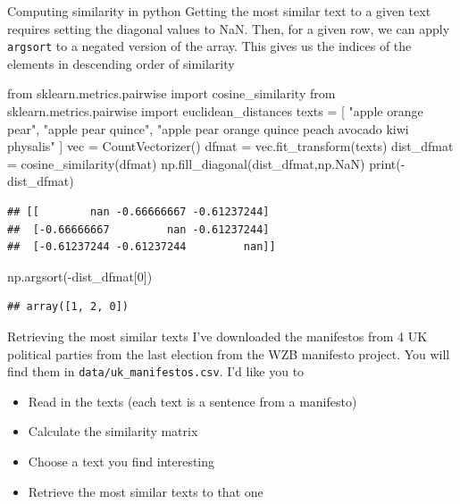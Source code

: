 \documentclass[
  10pt,
  ignorenonframetext,
  aspectratio=169]{beamer}
\newenvironment{Shaded}{\begin{snugshade}}{\end{snugshade}}
\newcommand{\BuiltInTok}[1]{\textcolor[rgb]{0.80,0.80,0.80}{#1}}
\newcommand{\DecValTok}[1]{\textcolor[rgb]{0.86,0.86,0.80}{#1}}
\newcommand{\ImportTok}[1]{\textcolor[rgb]{0.80,0.80,0.80}{#1}}
\newcommand{\NormalTok}[1]{\textcolor[rgb]{0.80,0.80,0.80}{#1}}
\newcommand{\OperatorTok}[1]{\textcolor[rgb]{0.94,0.94,0.82}{#1}}
\newcommand{\StringTok}[1]{\textcolor[rgb]{0.80,0.58,0.58}{#1}}
\providecommand{\tightlist}{%
  \setlength{\itemsep}{0pt}\setlength{\parskip}{0pt}}
\begin{document}
\begin{frame}[fragile]{Computing similarity in python}
\protect\hypertarget{computing-similarity-in-python-1}{}
Getting the most similar text to a given text requires setting the
diagonal values to NaN. Then, for a given row, we can apply
\texttt{argsort} to a negated version of the array. This gives us the
indices of the elements in descending order of similarity

\scriptsize

\begin{Shaded}
\begin{Highlighting}[]
\ImportTok{from}\NormalTok{ sklearn.metrics.pairwise }\ImportTok{import}\NormalTok{ cosine\_similarity}
\ImportTok{from}\NormalTok{ sklearn.metrics.pairwise }\ImportTok{import}\NormalTok{ euclidean\_distances}
\NormalTok{texts }\OperatorTok{=}\NormalTok{ [}
  \StringTok{"apple orange pear"}\NormalTok{, }\StringTok{"apple pear quince"}\NormalTok{,}
  \StringTok{"apple pear orange quince peach avocado kiwi physalis"}
\NormalTok{]}
\NormalTok{vec }\OperatorTok{=}\NormalTok{ CountVectorizer()}
\NormalTok{dfmat }\OperatorTok{=}\NormalTok{ vec.fit\_transform(texts)}
\NormalTok{dist\_dfmat }\OperatorTok{=}\NormalTok{ cosine\_similarity(dfmat)}
\NormalTok{np.fill\_diagonal(dist\_dfmat,np.NaN)}
\BuiltInTok{print}\NormalTok{(}\OperatorTok{{-}}\NormalTok{dist\_dfmat)}
\end{Highlighting}
\end{Shaded}

\begin{verbatim}
## [[        nan -0.66666667 -0.61237244]
##  [-0.66666667         nan -0.61237244]
##  [-0.61237244 -0.61237244         nan]]
\end{verbatim}

\begin{Shaded}
\begin{Highlighting}[]
\NormalTok{np.argsort(}\OperatorTok{{-}}\NormalTok{dist\_dfmat[}\DecValTok{0}\NormalTok{])}
\end{Highlighting}
\end{Shaded}

\begin{verbatim}
## array([1, 2, 0])
\end{verbatim}
\end{frame}

\begin{frame}[fragile]{Retrieving the most similar texts}
\protect\hypertarget{retrieving-the-most-similar-texts}{}
I've downloaded the manifestos from 4 UK political parties from the last
election from the WZB manifesto project. You will find them in
\texttt{data/uk\_manifestos.csv}. I'd like you to

\begin{itemize}
\tightlist
\item
  Read in the texts (each text is a sentence from a manifesto)
\item
  Calculate the similarity matrix
\item
  Choose a text you find interesting
\item
  Retrieve the most similar texts to that one
\end{itemize}
\end{frame}
\end{document}
